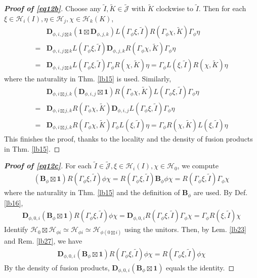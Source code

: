\documentclass[11pt,b5paper,notitlepage]{article}
\theoremstyle{definition}
\theoremstyle{plain}
\newcommand{\wtd}{\widetilde}
\newcommand{\idt}{\mathbf{1}}
\newcommand{\Jtd}{\widetilde{\mathcal J}}
\newcommand{\mbf}{\mathbf}
\newcommand{\MH}{\mathcal H}
\numberwithin{equation}{section}
\begin{document}
\begin{appendices}
\begin{proof}[\textbf{Proof of \eqref{eq12b}}]
Choose any $\wtd I,\wtd K\in\Jtd$ with $\wtd K$ clockwise to $\wtd I$. Then for each $\xi\in\MH_i(I),\eta\in\MH_j,\chi\in\MH_k(K)$,
\begin{align*}
&\mbf D_{\phi,i,j\boxtimes k}(\idt\boxtimes\mbf D_{\phi,j,k})L(\Gamma_\phi\xi,\wtd I)R(\Gamma_\phi\chi,\wtd K)\Gamma_\phi\eta\\
=&\mbf D_{\phi,i,j\boxtimes k}L(\Gamma_\phi\xi,\wtd I)\mbf D_{\phi,j,k}R(\Gamma_\phi\chi,\wtd K)\Gamma_\phi\eta\\
=&\mbf D_{\phi,i,j\boxtimes k}L(\Gamma_\phi\xi,\wtd I)\Gamma_\phi R(\chi,\wtd K)\eta=\Gamma_\phi L(\xi,\wtd I)R(\chi,\wtd K)\eta
\end{align*}
where the naturality in Thm. \ref{lb15} is used. Similarly,
\begin{align*}
&\mbf D_{\phi,i\boxtimes j,k}(\mbf D_{\phi,i,j}\boxtimes \idt)R(\Gamma_\phi\chi,\wtd K)L(\Gamma_\phi\xi,\wtd I)\Gamma_\phi\eta\\
=&\mbf D_{\phi,i\boxtimes j,k}R(\Gamma_\phi\chi,\wtd K)\mbf D_{\phi,i,j}L(\Gamma_\phi\xi,\wtd I)\Gamma_\phi\eta\\
=&\mbf D_{\phi,i\boxtimes j,k}R(\Gamma_\phi\chi,\wtd K)\Gamma_\phi L(\xi,\wtd I)\eta=\Gamma_\phi R(\chi,\wtd K)L(\xi,\wtd I)\eta
\end{align*}
This finishes the proof, thanks to the locality and the density of fusion products in Thm. \ref{lb15}.
\end{proof}

\begin{proof}[\textbf{Proof of \eqref{eq12c}}]
For each $\wtd I\in\Jtd,\xi\in\MH_i(I),\chi\in\MH_0$, we compute
\begin{align*}
(\mbf B_\phi\boxtimes\idt)R(\Gamma_\phi\xi,\wtd I)\phi\chi=R(\Gamma_\phi\xi,\wtd I)\mbf B_\phi\phi\chi=R(\Gamma_\phi\xi,\wtd I)\Gamma_\phi\chi
\end{align*}
where the naturality in Thm. \ref{lb15} and the definition of $\mbf B_\phi$ are used. By Def. \ref{lb16},
\begin{align*}
\mbf D_{\phi,0,i}(\mbf B_\phi\boxtimes\idt)R(\Gamma_\phi\xi,\wtd I)\phi\chi=\mbf D_{\phi,0,i}R(\Gamma_\phi\xi,\wtd I)\Gamma_\phi\chi=\Gamma_\phi R(\xi,\wtd I)\chi
\end{align*}
Identify $\MH_0\boxtimes\MH_{\phi i}\simeq\MH_{\phi i}\simeq\MH_{\phi(0\boxtimes i)}$ using the unitors. Then, by Lem. \ref{lb23} and Rem. \ref{lb27}, we have
\begin{align*}
\mbf D_{\phi,0,i}(\mbf B_\phi\boxtimes\idt)R(\Gamma_\phi\xi,\wtd I)\phi\chi=R(\Gamma_\phi\xi,\wtd I)\phi\chi
\end{align*}
By the density of fusion products, $\mbf D_{\phi,0,i}(\mbf B_\phi\boxtimes\idt)$ equals the identity.
\end{proof}


\end{appendices}
\end{document}
